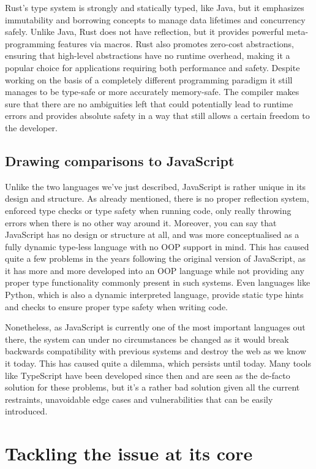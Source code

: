 Rust's type system is strongly and statically typed, like Java, but it emphasizes immutability and borrowing concepts to manage data lifetimes and concurrency safely. Unlike Java, Rust does not have reflection, but it provides powerful meta-programming features via macros. Rust also promotes zero-cost abstractions, ensuring that high-level abstractions have no runtime overhead, making it a popular choice for applications requiring both performance and safety. Despite working on the basis of a completely different programming paradigm it still manages to be type-safe or more accurately memory-safe. The compiler makes sure that there are no ambiguities left that could potentially lead to runtime errors and provides absolute safety in a way that still allows a certain freedom to the developer.

\subsection{Drawing comparisons to JavaScript}

Unlike the two languages we've just described, JavaScript is rather unique in its design and structure. As already mentioned, there is no proper reflection system, enforced type checks or type safety when running code, only really throwing errors when there is no other way around it. Moreover, you can say that JavaScript has no design or structure at all, and was more conceptualised as a fully dynamic type-less language with no OOP support in mind. This has caused quite a few problems in the years following the original version of JavaScript, as it has more and more developed into an OOP language while not providing any proper type functionality commonly present in such systems. Even languages like Python, which is also a dynamic interpreted language, provide static type hints and checks to ensure proper type safety when writing code.

Nonetheless, as JavaScript is currently one of the most important languages out there, the system can under no circumstances be changed as it would break backwards compatibility with previous systems and destroy the web as we know it today. This has caused quite a dilemma, which persists until today. Many tools like TypeScript have been developed since then and are seen as the de-facto solution for these problems, but it's a rather bad solution given all the current restraints, unavoidable edge cases and vulnerabilities that can be easily introduced.

\section{Tackling the issue at its core}

